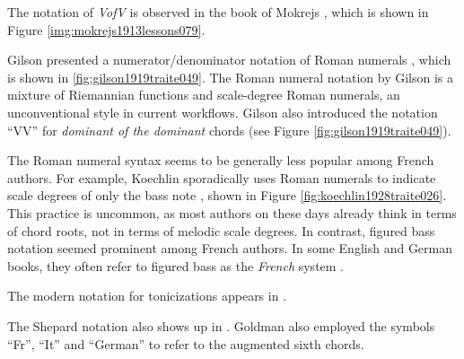The notation of \emph{VofV} is observed in the book of Mokrejs \cite{mokrejs1913lessons}, which is shown in Figure \ref{img:mokrejs1913lessons079}.

Gilson presented a numerator/denominator notation of Roman numerals \cite{gilson1919traite}, which is shown in \ref{fig:gilson1919traite049}.
The Roman numeral notation by Gilson is a mixture of Riemannian functions and scale-degree Roman numerals, an unconventional style in current workflows.
Gilson also introduced the notation ``VV'' for \emph{dominant of the dominant} chords (see Figure \ref{fig:gilson1919traite049}).

The Roman numeral syntax seems to be generally less popular among French authors.
For example, Koechlin sporadically uses Roman numerals to indicate scale degrees of only the bass note \cite{koechlin1928traite}, shown in Figure \ref{fig:koechlin1928traite026}.
This practice is uncommon, as most authors on these days already think in terms of chord roots, not in terms of melodic scale degrees.
In contrast, figured bass notation seemed prominent among French authors.
In some English and German books, they often refer to figured bass as the \emph{French} system .


The modern notation for tonicizations appears in \cite{tischler1964practical}.

The Shepard notation also shows up in \cite{goldman1965harmony}.
Goldman also employed the symbols ``Fr'', ``It'' and ``German'' to refer to the augmented sixth chords.



